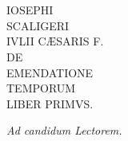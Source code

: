 

\chapter{}
\begin{center}
\begin{textsc}
\Large IOSEPHI\\
\Huge SCALIGERI\\
\Large IVLII CÆSARIS F.\\
\large DE\\
\Huge EMENDATIONE\\
\Large TEMPORUM\\
\large LIBER PRIMVS.\\
\end{textsc}
\em{Ad candidum Lectorem.}
\end{center}
\normalsize

